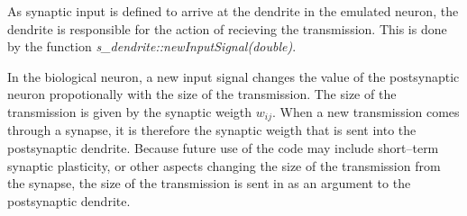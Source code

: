 
	As synaptic input is defined to arrive at the dendrite in the emulated neuron, the dendrite is responsible for the action of recieving the transmission.
	This is done by the function \emph{s\_dendrite::newInputSignal(double)}.
	

	In the biological neuron, a new input signal changes the value of the postsynaptic neuron propotionally with the size of the transmission.
	The size of the transmission is given by the synaptic weigth $w_{ij}$.
	When a new transmission comes through a synapse, it is therefore the synaptic weigth that is sent into the postsynaptic dendrite.
	Because future use of the code may include short--term synaptic plasticity, or other aspects changing the size of the transmission from the synapse, the size of the transmission is sent in as an argument to the postsynaptic dendrite.



%


